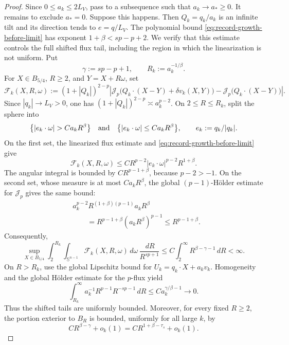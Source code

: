 \documentclass[11pt,reqno]{amsart}
\numberwithin{equation}{section}
\newcommand{\Jp}{\mathcal J_p}
\newcommand{\dd}{\,d}
\theoremstyle{remark}
\begin{document}
\begin{proof}
Since \(0\le a_k\le2L_V\), pass to a subsequence such that
\(a_k\to a_*\ge0\).  It remains to exclude \(a_*=0\).  Suppose this
happens.  Then
$Q_k=q_k/a_k$ is an infinite tilt and its direction tends to
$e=q/L_V$.  The polynomial bound
\eqref{eq:record-growth-before-limit} has exponent
$1+\beta<sp-p+2$.  We verify that this estimate controls the full shifted
flux tail, including the region in which the linearization is not
uniform.  Put
\[
 \gamma:=sp-p+1,
 \qquad R_k:=a_k^{-1/\beta}.
\]
For \(X\in B_{5/4}\), \(R\ge2\), and
\(Y=X+R\omega\), set
\begin{equation*}
 \mathcal F_k(X,R,\omega):=(1+|Q_k|)^{2-p}
 \left|\Jp\bigl(Q_k\cdot(X-Y)+\delta v_k(X,Y)\bigr)
       -\Jp\bigl(Q_k\cdot(X-Y)\bigr)\right|.
\end{equation*}
Since \(|q_k|\to L_V>0\), one has
\((1+|Q_k|)^{2-p}\asymp a_k^{p-2}\).  On \(2\le R\le R_k\), split the
sphere into
\begin{equation*}
 \bigl\{|e_k\cdot\omega|>C a_kR^\beta\bigr\}
 \quad\hbox{and}\quad
 \bigl\{|e_k\cdot\omega|\le C a_kR^\beta\bigr\},
 \qquad e_k:=q_k/|q_k|.
\end{equation*}
On the first set, the linearized flux estimate and
\eqref{eq:record-growth-before-limit} give
\begin{equation*}
 \mathcal F_k(X,R,\omega)
 \le C R^{p-2}|e_k\cdot\omega|^{p-2}R^{1+\beta}.
\end{equation*}
The angular integral is bounded by \(CR^{p-1+\beta}\), because
\(p-2>-1\).  On the second set, whose measure is at most
\(Ca_kR^\beta\), the global \((p-1)\)-H\"older estimate for \(\Jp\)
gives the same bound:
\begin{align*}
 &a_k^{p-2}R^{(1+\beta)(p-1)}a_kR^\beta\\
 &\qquad=R^{p-1+\beta}(a_kR^\beta)^{p-1}
 \le R^{p-1+\beta}.
\end{align*}
Consequently,
\begin{equation*}
 \sup_{X\in B_{5/4}}
 \int_2^{R_k}\int_{\mathbb S^{n-1}}
 \mathcal F_k(X,R,\omega)\dd\omega\,
 \frac{\dd R}{R^{sp+1}}
 \le C\int_2^\infty R^{\beta-\gamma-1}\dd R<\infty.
\end{equation*}
On \(R>R_k\), use the global Lipschitz bound for
\(U_k=q_k\cdot X+a_kv_k\).  Homogeneity and the global H\"older estimate
for the \(p\)-flux yield
\[
 \int_{R_k}^\infty
 a_k^{-1}R^{p-1}R^{-sp-1}\dd R
 \le C a_k^{\gamma/\beta-1}\longrightarrow0.
\]
Thus the shifted tails are uniformly bounded.  Moreover, for every fixed
\(R\ge2\), the portion exterior to \(B_R\) is bounded, uniformly for all
large \(k\), by
\begin{equation}
 C R^{\beta-\gamma}+o_k(1)
 =C R^{1+\beta-\tau_s}+o_k(1).
 \label{eq:vanishing-record-linearized-tail}
\end{equation}


\end{proof}
\end{document}
